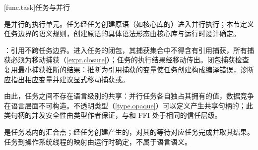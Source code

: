 [func.task]{任务与并行}

\pnum
{}是并行的执行单元。任务经任务创建原语（如核心库的）进入并行执行；本节定义任务边界的语义规则，创建原语的具体语法形态由核心库与运行时设计确定。

\pnum
{}：引用不跨任务边界。进入任务的闭包，其捕获集合中不得含有引用捕获，所有捕获必须为移动捕获（\ref{expr.closure}）；任务的执行结果经移动传出。闭包捕获检查复用最小捕获推断的结果：推断为引用捕获的变量使任务创建构成编译错误，诊断应指出相应变量并建议显式移动捕获或。

\pnum
由此，任务之间不存在语言级别的共享：并行任务各自独占其拥有的值，数据竞争在语言层面不可构造。不透明类型（\ref{type.opaque}）可以定义产生共享句柄的；此类句柄的并发安全性由类型作者保证，与和 FFI 处于相同的信任层级。

\pnum
{}是任务域内的汇合点；经任务创建产生的，对其的等待对应任务完成并取其结果。任务到操作系统线程的映射由运行时确定，不属于语言语义。